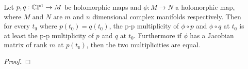 \documentclass[a4paper]{article}
\begin{document}
\begin{lemma}\label{ppmul}
    Let $p,q: \mathbb{C}\mathbb{P}^1 \to M$ be holomorphic maps and $\phi: M\to N$ a holomorphic map, where $M$ and $N$ are $m$ and $n$ dimensional complex manifolds respectively. Then for every $t_0$ where $p(t_0)=q(t_0)$, the p-p multiplicity of $\phi \circ p$ and $\phi \circ q$ at $t_0$ is at least the p-p multiplicity of $p$ and $q$ at $t_0$. Furthermore if $\phi$ has a Jacobian matrix of rank $m$ at $p(t_0)$, then the two multiplicities are equal.
\end{lemma}
\begin{proof}











\end{proof}
\end{document}
